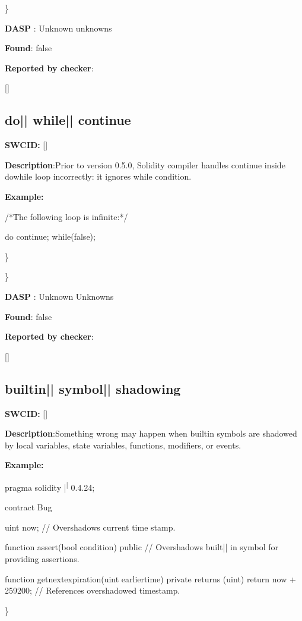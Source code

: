 \documentclass{article}
\begin{document}
\} 

\textbf{DASP} : Unknown unknowns

\textbf{Found}: false

\textbf{Reported by checker}: 
\begin{ffcode} 

[]
\end{ffcode} 
\subsection{do{|\textunderscore| }while{|\textunderscore| }continue} 
\textbf{SWC{\textunderscore }ID:} []

\textbf{Description}:Prior to version 0.5.0, Solidity compiler handles continue inside do{\textendash}while loop incorrectly: it ignores while condition.


\textbf{Example:} 
\begin{ffcode} 

/*The following loop is infinite:*/ 

do {
    continue;
} while(false);

\end{ffcode} 
\} 

\} 

\textbf{DASP} : Unknown Unknowns

\textbf{Found}: false

\textbf{Reported by checker}: 
\begin{ffcode} 

[]
\end{ffcode} 
\subsection{builtin{|\textunderscore| }symbol{|\textunderscore| }shadowing} 
\textbf{SWC{\textunderscore }ID:} []

\textbf{Description}:Something wrong may happen when built{\textendash}in symbols are shadowed by local variables, state variables, functions, modifiers, or events.


\textbf{Example:} 
\begin{ffcode} 

pragma solidity |\textsuperscript| 0.4.24;

contract Bug {
    uint now; // Overshadows current time stamp.

    function assert(bool condition) public {
        // Overshadows built|\textendash| in symbol for providing assertions.
    }

    function get\textunderscore next\textunderscore expiration(uint earlier\textunderscore time) private returns (uint) {
        return now + 259200; // References overshadowed timestamp.
    }
}

\end{ffcode} 
\} 
\end{document}

